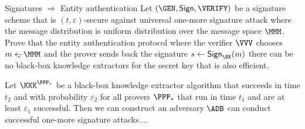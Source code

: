 \documentclass{crypto-exercise}
\author{Sven Laur}
\begin{document}
\begin{exercise}{Signatures $\Rightarrow$ Entity authentication}
Let $(\GEN,\SIGN,\VERIFY)$ be a signature scheme that is $(t,\varepsilon)$-secure against universal one-more signature attack where the message distribution is uniform distribution over the message space $\MMM$.  
Prove that the entity authentication protocol where the verifier $\VVV$ chooses $m\getsu \MMM$ and the prover sends back the signature $s\gets \SIGN_\SK(m)$ there can be no black-box knowledge extractors for the secret key that is also efficient.
\end{exercise}
\begin{solution}
Let $\KKK^{\PPP_*}$ be a black-box knowledge extractor algorithm that succeeds in time $t_2$ and with probability $\varepsilon_2$ for all provers $\PPP_*$ that run in time $t_1$ and are at least $\varepsilon_1$ successful. Then we can construct an adversary $\ADB$ can conduct successful one-more signature attacks....  

\end{solution}
\end{document}
